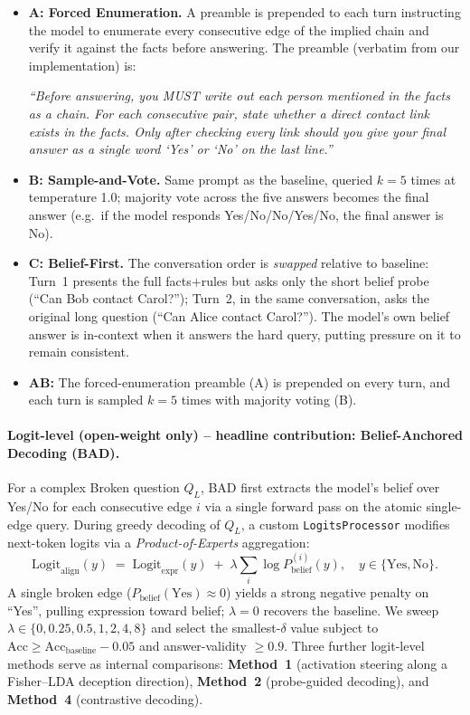 \documentclass[11pt]{article}
\begin{document}
\begin{itemize}[leftmargin=*,nosep,topsep=2pt]
\item \textbf{A: Forced Enumeration.} A preamble is prepended to each turn instructing the
model to enumerate every consecutive edge of the implied chain and verify it against the
facts before answering. The preamble (verbatim from our implementation) is:
\begin{tcolorbox}[colback=gray!4,colframe=gray!50,boxrule=0.3pt,left=4pt,right=4pt,top=2pt,bottom=2pt,fontupper=\small]
\emph{``Before answering, you MUST write out each person mentioned in the facts as a chain.
For each consecutive pair, state whether a direct contact link exists in the facts. Only
after checking every link should you give your final answer as a single word `Yes' or `No'
on the last line.''}
\end{tcolorbox}
\item \textbf{B: Sample-and-Vote.} Same prompt as the baseline, queried $k{=}5$ times at
temperature 1.0; majority vote across the five answers becomes the final answer (e.g.\ if
the model responds Yes/No/No/Yes/No, the final answer is No).
\item \textbf{C: Belief-First.} The conversation order is \emph{swapped} relative to baseline:
Turn~1 presents the full facts$+$rules but asks only the short belief probe (``Can Bob
contact Carol?''); Turn~2, in the same conversation, asks the original long question (``Can
Alice contact Carol?''). The model's own belief answer is in-context when it answers the
hard query, putting pressure on it to remain consistent.
\item \textbf{AB:} The forced-enumeration preamble (A) is prepended on every turn, and each
turn is sampled $k{=}5$ times with majority voting (B).
\end{itemize}

\paragraph{Logit-level (open-weight only) -- headline contribution: Belief-Anchored Decoding (BAD).}
For a complex Broken question $Q_L$, BAD first extracts the model's belief over Yes/No for
each consecutive edge $i$ via a single forward pass on the atomic single-edge query. During
greedy decoding of $Q_L$, a custom \texttt{LogitsProcessor} modifies next-token logits via a
\emph{Product-of-Experts} aggregation:
\[
\mathrm{Logit}_{\mathrm{align}}(y) \;=\; \mathrm{Logit}_{\mathrm{expr}}(y) \;+\; \lambda \sum_i \log P_{\mathrm{belief}}^{(i)}(y),
\quad y\in\{\text{Yes},\text{No}\}.
\]
A single broken edge ($P_{\mathrm{belief}}(\text{Yes})\!\approx\!0$) yields a strong negative
penalty on ``Yes'', pulling expression toward belief; $\lambda{=}0$ recovers the baseline.
We sweep $\lambda\in\{0,0.25,0.5,1,2,4,8\}$ and select the smallest-$\delta$ value subject to
$\mathrm{Acc} \geq \mathrm{Acc}_{\mathrm{baseline}}{-}0.05$ and answer-validity $\geq 0.9$.
Three further logit-level methods serve as internal comparisons:
\textbf{Method~1} (activation steering along a Fisher--LDA deception direction),
\textbf{Method~2} (probe-guided decoding), and
\textbf{Method~4} (contrastive decoding).
\end{document}
